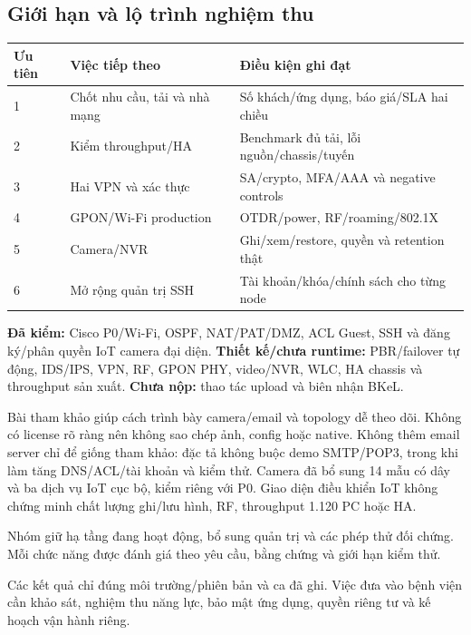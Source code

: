 \documentclass[
  11pt,
]{article}
\begin{document}
\subsection{Giới hạn và lộ trình nghiệm thu}
\par\noindent
{}
\begin{tabularx}{\linewidth}{@{}lXX@{}}\toprule
Ưu tiên & Việc tiếp theo & Điều kiện ghi đạt\\\midrule
1 & Chốt nhu cầu, tải và nhà mạng & Số khách/ứng dụng, báo giá/SLA hai chiều\\
2 & Kiểm throughput/HA & Benchmark đủ tải, lỗi nguồn/chassis/tuyến\\
3 & Hai VPN và xác thực & SA/crypto, MFA/AAA và negative controls\\
4 & GPON/Wi-Fi production & OTDR/power, RF/roaming/802.1X\\
5 & Camera/NVR & Ghi/xem/restore, quyền và retention thật\\
6 & Mở rộng quản trị SSH & Tài khoản/khóa/chính sách cho từng node\\\bottomrule\end{tabularx}\par

\textbf{Đã kiểm:} Cisco P0/Wi-Fi, OSPF, NAT/PAT/DMZ, ACL Guest, SSH và đăng ký/phân quyền IoT camera đại diện. \textbf{Thiết kế/chưa runtime:} PBR/failover tự động, IDS/IPS, VPN, RF, GPON PHY, video/NVR, WLC, HA chassis và throughput sản xuất. \textbf{Chưa nộp:} thao tác upload và biên nhận BKeL.

Bài tham khảo \cite{reference-project} giúp cách trình bày camera/email và topology dễ theo dõi. Không có license rõ ràng nên không sao chép ảnh, config hoặc native. Không thêm email server chỉ để giống tham khảo: đặc tả không buộc demo SMTP/POP3, trong khi làm tăng DNS/ACL/tài khoản và kiểm thử. Camera đã bổ sung 14 mẫu có dây và ba dịch vụ IoT cục bộ, kiểm riêng với P0. Giao diện điều khiển IoT không chứng minh chất lượng ghi/lưu hình, RF, throughput 1.120 PC hoặc HA.

Nhóm giữ hạ tầng đang hoạt động, bổ sung quản trị và các phép thử đối chứng. Mỗi chức năng được đánh giá theo yêu cầu, bằng chứng và giới hạn kiểm thử.

Các kết quả chỉ đúng môi trường/phiên bản và ca đã ghi. Việc đưa vào bệnh viện cần khảo sát, nghiệm thu năng lực, bảo mật ứng dụng, quyền riêng tư và kế hoạch vận hành riêng.

\clearpage
\end{document}
